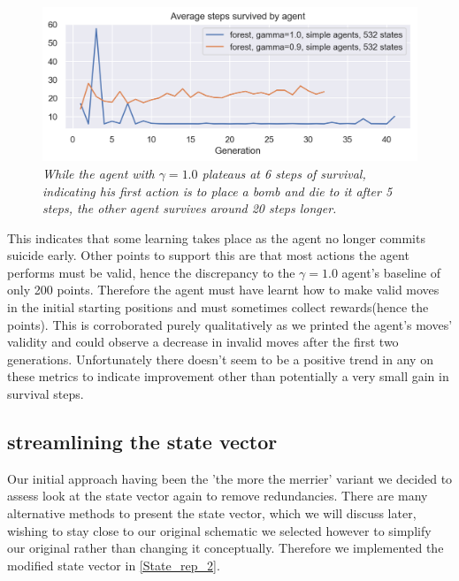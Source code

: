 \begin{figure}[!h]
\centering
	\includegraphics[width=\linewidth]{images/forest09_vs_forest1ste.png}
	\caption{\textit{While the agent with $\gamma = 1.0$ plateaus at 6 steps of survival, indicating his first action is to place a bomb and die to it after 5 steps, the other agent survives around 20 steps longer.}}
	\label{forest09_vs_forest1ste}
\end{figure}
\newpage
This indicates that some learning takes place as the agent no longer commits suicide early. Other points to support this are that most actions the agent performs must be valid, hence the discrepancy to the $\gamma = 1.0$ agent's baseline of only 200 points. Therefore the agent must have learnt how to make valid moves in the initial starting positions and must sometimes collect rewards(hence the points). This is corroborated purely qualitatively as we printed the agent's moves' validity and could observe a decrease in invalid moves after the first two generations. Unfortunately there doesn't seem to be a positive trend in any on these metrics to indicate improvement other than potentially a very small gain in survival steps.

\subsection{streamlining the state vector}
Our initial approach having been the 'the more the merrier' variant we decided to assess look at the state vector again to remove redundancies. There are many alternative methods to present the state vector, which we will discuss later, wishing to stay close to our original schematic we selected however to simplify our original rather than changing it conceptually. Therefore we implemented the modified state vector in \ref{State_rep_2}.

